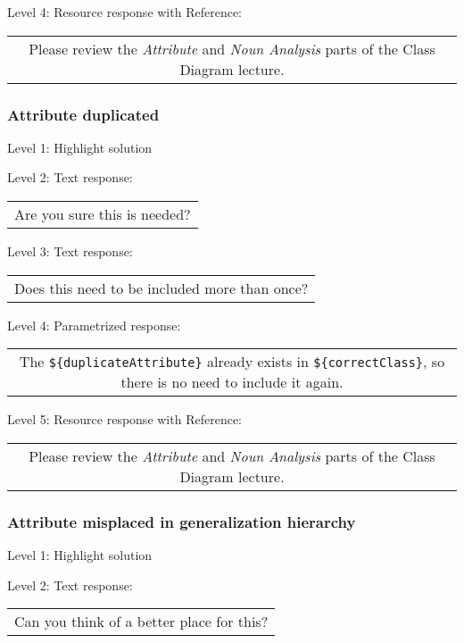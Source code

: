 \noindent Level 4: Resource response with Reference:

\begin{tabular}{|c}
Please review the \textit{Attribute} and \textit{Noun Analysis} parts of the Class Diagram lecture.
\end{tabular} \medskip


\subsubsection{Attribute duplicated}

\noindent Level 1: Highlight solution \medskip

\noindent Level 2: Text response: \medskip

\begin{tabular}{|c}
Are you sure this is needed?
\end{tabular} \medskip

\noindent Level 3: Text response: \medskip

\begin{tabular}{|c}
Does this need to be included more than once?
\end{tabular} \medskip

\noindent Level 4: Parametrized response: \medskip

\begin{tabular}{|c}
The \verb|${duplicateAttribute}| already exists in \verb|${correctClass}|, so there is no need to include it again.
\end{tabular} \medskip

\noindent Level 5: Resource response with Reference:

\begin{tabular}{|c}
Please review the \textit{Attribute} and \textit{Noun Analysis} parts of the Class Diagram lecture.
\end{tabular} \medskip


\subsubsection{Attribute misplaced in generalization hierarchy}

\noindent Level 1: Highlight solution \medskip

\noindent Level 2: Text response: \medskip

\begin{tabular}{|c}
Can you think of a better place for this?
\end{tabular} \medskip

